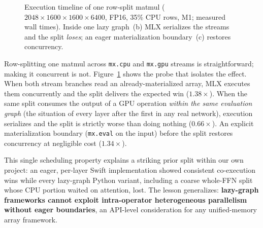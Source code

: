 \documentclass{article}
\newcommand{\x}[1]{$#1\times$}
\begin{document}
\begin{figure}[t]
\centering
{}
\caption{Execution timeline of one row-split matmul
($2048{\times}1600 \times 1600{\times}6400$, FP16, 35\% CPU rows, M1;
measured wall times). Inside one lazy graph~(b) MLX serializes the streams
and the split \emph{loses}; an eager materialization boundary~(c) restores
concurrency.}
\label{fig:timeline}
\end{figure}

Row-splitting one matmul across \texttt{mx.cpu} and \texttt{mx.gpu} streams
is straightforward; making it concurrent is not.
Figure~\ref{fig:timeline} shows the probe that isolates the effect. When
both stream branches read an already-materialized array, MLX executes them
concurrently and the split delivers the expected win (\x{1.38}). When the
same split consumes the output of a GPU operation \emph{within the same
evaluation graph} (the situation of every layer after the first in any
real network), execution serializes and the split is strictly worse than
doing nothing (\x{0.66}). An explicit materialization boundary
(\texttt{mx.eval} on the input) before the split restores concurrency at
negligible cost (\x{1.34}).

This single scheduling property explains a striking prior split within our
own project: an eager, per-layer Swift implementation showed consistent
co-execution wins while every lazy-graph Python variant, including a
coarse whole-FFN split whose CPU portion waited on attention, lost. The
lesson generalizes: \textbf{lazy-graph frameworks cannot exploit
intra-operator heterogeneous parallelism without eager boundaries}, an
API-level consideration for any unified-memory array framework.
\end{document}
